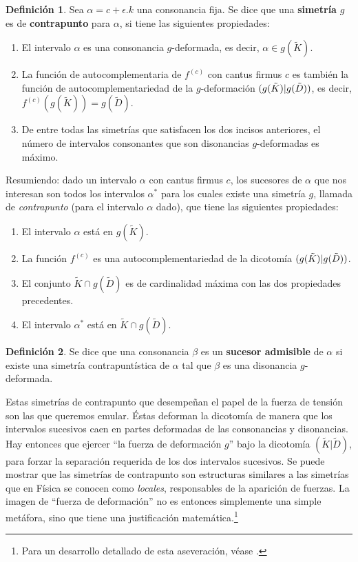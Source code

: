 \documentclass[letterpaper,12pt]{book}
\theoremstyle{definition} \newtheorem{Def}{Definición}[chapter]
\theoremstyle{definition} \newtheorem{Teo}{Teorema}[chapter]
\theoremstyle{definition} \newtheorem{Pro}{Proposición}[chapter]
\theoremstyle{definition} \newtheorem{Lema}{Lema}[chapter]
\begin{document}
\begin{Def}  
Sea $\alpha=c+\epsilon.k$ una consonancia fija. Se dice que una \textbf{simetría} $g$ es de \textbf{contrapunto} para $\alpha$, si tiene las siguientes propiedades:
\begin{enumerate}
\item El intervalo $\alpha$ es una consonancia $g$-deformada, es decir, $\alpha \in g(\tilde{K})$.
\item La función de autocomplementaria de $f^{(c)}$ con cantus firmus $c$ es también la función de autocomplementariedad de la $g$-deformación $(g(\tilde{K})|\\*g(\tilde{D}))$, es decir, $f^{(c)}(g(\tilde{K}))=g(\tilde{D})$.
\item De entre todas las simetrías que satisfacen los dos incisos anteriores, el número de intervalos consonantes que son disonancias $g$-deformadas es máximo.
\end{enumerate}     
\end{Def}

Resumiendo: dado un intervalo $\alpha$ con cantus firmus $c$, los sucesores de $\alpha$ que nos interesan son todos los intervalos $\alpha^*$  para los cuales existe una simetría $g$, llamada de \emph{ contrapunto} (para el intervalo $\alpha$ dado), que tiene las siguientes propiedades:

\begin{enumerate}
\item El intervalo $\alpha$ está en $g(\tilde {K})$.
\item La función $f^{(c)}$ es una autocomplementariedad de la dicotomía $(g(\tilde{K})|\\g( \tilde{D}))$.
\item El conjunto $\tilde{K} \cap g(\tilde{D})$ es de cardinalidad máxima con las dos propiedades precedentes.
\item El intervalo $\alpha^*$ está en $\tilde{K} \cap g(\tilde{D})$.
\end{enumerate}

\begin{Def}  
Se dice que una consonancia $\beta$  es un \textbf{sucesor admisible} de $\alpha$ si existe una simetría contrapuntística de $\alpha$ tal que $\beta$ es una disonancia $g$-deformada.  
\end{Def}

Estas simetrías de contrapunto que desempeñan el papel de la fuerza de tensión son las que queremos emular. Éstas deforman la dicotomía de manera que los intervalos sucesivos caen en partes deformadas de las consonancias y disonancias. Hay entonces que ejercer ``la fuerza de deformación $g$'' bajo la dicotomía $(\tilde{K}| \tilde{D})$, para forzar la separación requerida de los dos intervalos sucesivos. Se puede mostrar que las simetrías de contrapunto son estructuras similares a las simetrías que en Física se conocen como \emph{locales}, responsables de la aparición de fuerzas. La imagen de ``fuerza de deformación'' no es entonces simplemente una simple metáfora, sino que tiene una justificación matemática.\footnote{Para un desarrollo detallado de esta aseveración, véase \cite{Topos}.}  
\end{document}
